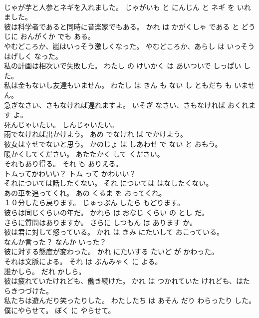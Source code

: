 \documentclass[8pt]{extreport}
\begin{document}
\begin{CJK}{UTF8}{min}
\\	じゃが芋と人参とネギを入れました。	じゃがいも と にんじん と ネギ を いれました。	
\\	彼は科学者であると同時に音楽家でもある。	かれ は かがくしゃ である と どうじに おんがくか でも ある。	
\\	やむどころか、嵐はいっそう激しくなった。	やむどころか、あらし は いっそう はげしく なった。	
\\	私の計画は相次いで失敗した。	わたし の けいかく は あいついで しっぱい した。	
\\	私は金もないし友達もいません。	わたし は きん も ない し ともだち も いません。	
\\	急ぎなさい、さもなければ遅れますよ。	いそぎ なさい、さもなければ おくれます よ。	
\\	死んじゃいたい。	しんじゃいたい。	
\\	雨でなければ出かけよう。	あめ でなけれ ば でかけよう。	
\\	彼女は幸せでないと思う。	かのじょ は しあわせ で ない と おもう。	
\\	暖かくしてください。	あたたかく して ください。	
\\	それもあり得る。	それ も ありえる。	
\\	トムってかわいい？	トム って かわいい？	
\\	それについては話したくない。	それ については はなしたくない。	
\\	あの車を追ってくれ。	あの くるま を おってくれ。	
\\	１０分したら戻ります。	じゅっぷん したら もどります。	
\\	彼らは同じくらいの年だ。	かれら は おなじ くらい の とし だ。	
\\	さらに質問はありますか。	さらに しつもん は あります か。	
\\	彼は君に対して怒っている。	かれ は きみ にたいして おこっている。	
\\	なんか言った？	なんか いった？	
\\	彼に対する態度が変わった。	かれ にたいする たいど が かわった。	
\\	それは文脈による。	それ は ぶんみゃく に よる。	
\\	誰かしら。	だれ かしら。	
\\	彼は疲れていたけれども、働き続けた。	かれ は つかれていた けれども、はたらきつづけた。	
\\	私たちは遊んだり笑ったりした。	わたしたち は あそん だり わらったり した。	
\\	僕にやらせて。	ぼく に やらせて。	

\end{CJK}
\end{document}
